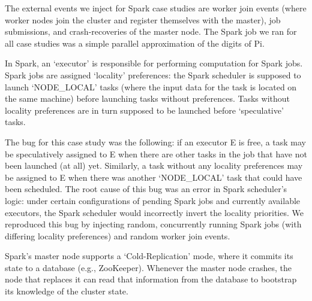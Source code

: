 The external events we inject for Spark case studies are worker join events
(where worker nodes join the cluster and register themselves with the master),
job submissions, and crash-recoveries of the master node. The Spark job we ran
for all case studies was a simple parallel approximation of the digits of Pi.



 In Spark, an `executor' is
responsible for performing computation for Spark jobs. Spark jobs are assigned
`locality' preferences: the Spark scheduler is supposed to launch
`NODE\_LOCAL' tasks (where the input data for the task is located on the same
machine) before launching tasks without preferences. Tasks without locality
preferences are in turn
supposed to be launched before `speculative' tasks.

The bug for this case
study was the following: if an executor E is free, a task may be speculatively assigned to E when there are other tasks in the job
that have not been launched (at all) yet. Similarly, a task without any locality preferences may be
assigned to E when there was another `NODE\_LOCAL' task that could have been scheduled.
The root cause of this bug was an error in Spark scheduler's logic: under
certain configurations of pending Spark jobs and currently available
executors, the Spark scheduler would incorrectly invert the locality priorities.
We reproduced this bug by injecting random, concurrently running Spark jobs
(with differing locality preferences) and random worker join events.


 Spark's
master node supports a `Cold-Replication' mode, where it commits its state to
a database (e.g., ZooKeeper). Whenever the master node crashes, the node that
replaces it can read that information from the database to bootstrap its
knowledge of the cluster state.


